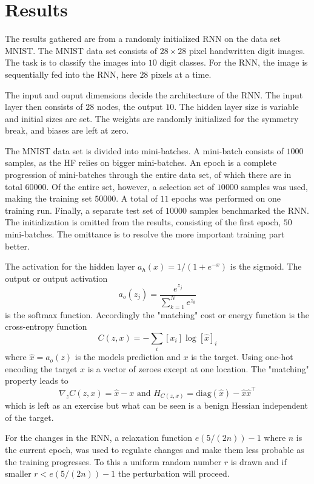 \chapter{Results}

The results gathered are from a randomly initialized RNN on the data set MNIST. The MNIST data set consists of $28 \times 28$ pixel handwritten digit images. The task is to classify the images into $10$ digit classes. For the RNN, the image is sequentially fed into the RNN, here $28$ pixels at a time. 

The input and ouput dimensions decide the architecture of the RNN. The input layer then consists of $28$ nodes, the output $10$. The hidden layer size is variable and initial sizes are set. The weights are randomly initialized for the symmetry break, and biases are left at zero. 

The MNIST data set is divided into mini-batches. A mini-batch consists of $1000$ samples, as the HF relies on bigger mini-batches. An epoch is a complete progression of mini-batches through the entire data set, of which there are in total $60 000$. Of the entire set, however, a selection set of $10 000$ samples was used, making the training set $50000$. A total of $11$ epochs was performed on one training run. Finally, a separate test set of $10000$ samples benchmarked the RNN. The initialization is omitted from the results, consisting of the first epoch, $50$ mini-batches. The omittance is to resolve the more important training part better.

The activation for the hidden layer $a_h(x) = 1/(1 + e^{-x})$ is the sigmoid. The output or output activation \[a_o(z_j) = \frac{e^{z_j}}{\sum_{k=1}^N e^{z_k}}\] is the softmax function. Accordingly the "matching" cost or energy function is the cross-entropy function \[C(z,x) = - \sum_i [x_i] \log [\hat{x}]_i\] where $\hat{x} = a_o(z)$ is the models prediction and $x$ is the target. Using one-hot encoding the target $x$ is a vector of zeroes except at one location. The "matching" property leads to \[\nabla_z C(z,x) = \hat{x} - x \text{ and } H_{C(z,x)} = \text{diag}(\hat{x}) - \hat{x} \hat{x}^\top\] which is left as an exercise but what can be seen is a benign Hessian independent of the target. 

For the changes in the RNN, a relaxation function $e(5/(2n)) - 1$ where $n$ is the current epoch, was used to regulate changes and make them less probable as the training progresses. To this a uniform random number $r$ is drawn and if smaller $ r < e(5/(2n)) - 1$ the perturbation will proceed.

